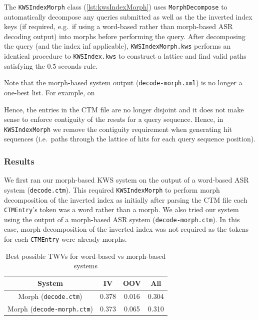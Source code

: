 \documentclass[a4paper,oneside,reqno]{amsart}
\begin{document}
The \texttt{KWSIndexMorph} class (\autoref{lst:kwsIndexMorph}) uses
\texttt{MorphDecompose} to automatically decompose any queries submitted as
well as the the inverted index keys (if required, e.g.\ if using a word-based
rather than morph-based ASR decoding output) into morphs before performing the
query. After decomposing the query (and the index inf applicable),
\texttt{KWSIndexMorph.kws} performs an identical procedure to
\texttt{KWSIndex.kws} to construct a lattice and find valid paths satisfying the $0.5$
seconds rule.

Note that the morph-based system output (\texttt{decode-morph.xml}) is no longer
a one-best list. For example, on %

Hence, the entries in the CTM file are no longer disjoint and it does not make
sense to enforce contiguity of the resuts for a query sequence. Hence, in
\texttt{KWSIndexMorph} we remove the contiguity requirement when generating hit
sequences (i.e.\ paths through the lattice of hits for each query sequence
position).

\subsubsection{Results}

We first ran our morph-based KWS system on the output of a word-based ASR
system (\texttt{decode.ctm}). This required \texttt{KWSIndexMorph} to perform
morph decomposition of the inverted index as initially after parsing the CTM
file each \texttt{CTMEntry}'s token was a word rather than a morph. We also
tried our system using the output of a morph-based ASR system
(\texttt{decode-morph.ctm}). In this case, morph decomposition of the inverted
index was not required as the tokens for each \texttt{CTMEntry} were already
morphs.

\begin{table}[ht!]
  \begin{tabular}{cccc}
    \toprule
    System                            & IV    & OOV   & All \\
    \midrule
    Morph (\texttt{decode.ctm})       & 0.378 & 0.016 & 0.304 \\
    Morph (\texttt{decode-morph.ctm}) & 0.373 & 0.065 & 0.310 \\
    \bottomrule
  \end{tabular}
  \caption{Best possible TWVs for word-based vs morph-based systems}
  \label{tab:morph}
\end{table}
\end{document}
